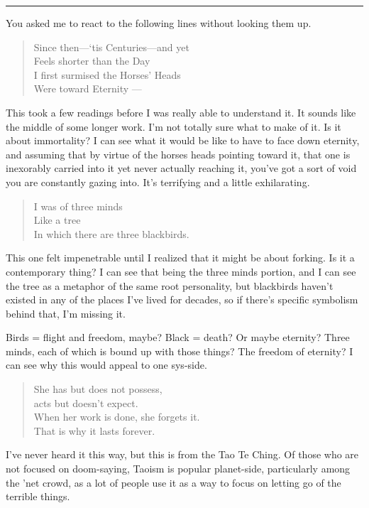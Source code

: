 \begin{center}\rule{0.5\linewidth}{0.5pt}\end{center}

\noindent You asked me to react to the following lines without looking them up.

\begin{quote}
Since then---`tis Centuries---and yet\\
Feels shorter than the Day\\
I first surmised the Horses' Heads\\
Were toward Eternity —
\end{quote}

\noindent This took a few readings before I was really able to understand it. It sounds like the middle of some longer work. I'm not totally sure what to make of it. Is it about immortality? I can see what it would be like to have to face down eternity, and assuming that by virtue of the horses heads pointing toward it, that one is inexorably carried into it yet never actually reaching it, you've got a sort of void you are constantly gazing into. It's terrifying and a little exhilarating.

\begin{quote}
I was of three minds\\
Like a tree\\
In which there are three blackbirds.
\end{quote}

\noindent This one felt impenetrable until I realized that it might be about forking. Is it a contemporary thing? I can see that being the three minds portion, and I can see the tree as a metaphor of the same root personality, but blackbirds haven't existed in any of the places I've lived for decades, so if there's specific symbolism behind that, I'm missing it.

Birds = flight and freedom, maybe? Black = death? Or maybe eternity? Three minds, each of which is bound up with those things? The freedom of eternity? I can see why this would appeal to one sys-side.

\begin{quote}
She has but does not possess,\\
acts but doesn't expect.\\
When her work is done, she forgets it.\\
That is why it lasts forever.
\end{quote}

\noindent I've never heard it this way, but this is from the Tao Te Ching. Of those who are not focused on doom-saying, Taoism is popular planet-side, particularly among the 'net crowd, as a lot of people use it as a way to focus on letting go of the terrible things.

